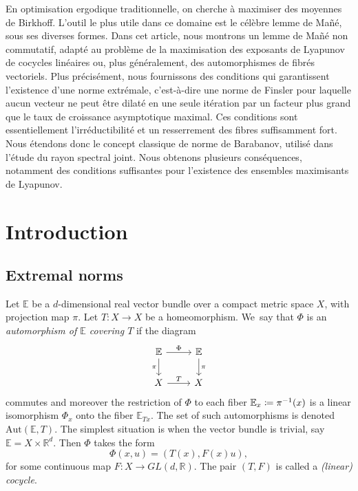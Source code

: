 \documentclass[JEP,XML,SOM,Unicode]{cedram}
\def\vcentcolon{\mathrel{\mathop\ordinarycolon}}
\providecommand\ordinarycolon{:}
\providecommand*\coloneqq{\vcentcolon\mathrel{\mkern-1.2mu}=}
\theoremstyle{plain}
\theoremstyle{definition}
\newcommand{\RR}{\mathbb{R}}
\newcommand{\EE}{\mathbb{E}}
\newcommand{\GL}{\mathit{GL}}
\newcommand{\Aut}{\mathrm{Aut}}
\begin{document}
\begin{altabstract}
En optimisation ergodique traditionnelle, on cherche à maximiser des moyennes de Birkhoff. L’outil le plus utile dans ce domaine est le célèbre lemme de Mañé, sous ses diverses formes. Dans cet article, nous montrons un lemme de Mañé non commutatif, adapté au problème de la maximisation des exposants de Lyapunov de cocycles linéaires ou, plus généralement, des automorphismes de fibrés vectoriels. Plus précisément, nous fournissons des conditions qui garantissent l’existence d’une norme extrémale, c’est-à-dire une norme de Finsler pour laquelle aucun vecteur ne peut être dilaté en une seule itération par un facteur plus grand que le taux de croissance asymptotique maximal. Ces conditions sont essentiellement l’irréductibilité et un resserrement des fibres suffisamment fort. Nous étendons donc le concept classique de norme de Barabanov, utilisé dans l’étude du rayon spectral joint. Nous obtenons plusieurs conséquences, notamment des conditions suffisantes pour l'existence des ensembles maximisants de Lyapunov.
\end{altabstract}

\maketitle

\tableofcontents


\section{Introduction}

\subsection{Extremal norms}\label{ss.intro_extremal}

Let $\EE$ be a $d$-dimensional real vector bundle over a compact metric space $X$, with projection map $\pi$.
Let $T \colon X \to X$ be a homeomorphism.
We~say that $\Phi$ is an \emph{automorphism of $\EE$ covering $T$} if
the diagram
\[
\begin{tikzcd}
\EE	\arrow[r,"\Phi"] \arrow[d,swap,"\pi"]	& \EE \arrow[d,"\pi"] \\
X	\arrow[r,"T"]						& X
\end{tikzcd}
\]
commutes and moreover the restriction of $\Phi$ to each fiber $\EE_x \coloneqq \pi^{-1}(x)$ is a linear isomorphism $\Phi_x$ onto the fiber $\EE_{Tx}$.
The set of such automorphisms is denoted $\Aut(\EE,T)$.
The simplest situation is when the vector bundle is trivial, say $\EE = X \times \RR^d$.
Then $\Phi$ takes the form
\begin{equation}\label{e.cocycle}
\Phi(x,u) = (T(x),F(x)u),
\end{equation}
for some continuous map $F \colon X \to \GL(d,\RR)$.
The pair $(T,F)$ is called a \emph{(linear) cocycle}.
\end{document}
